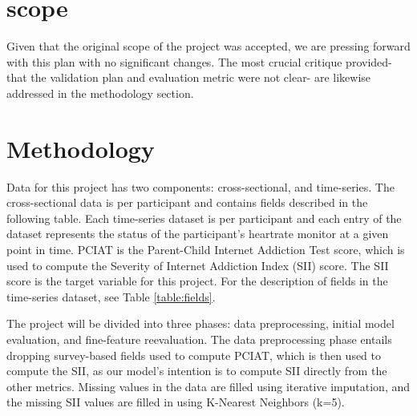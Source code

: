 \documentclass[11pt]{extarticle}
\newcommand{\todo}{\textcolor{red}{TODO:}~}
\begin{document}
\section{scope}

    Given that the original scope of the project was accepted, we are pressing forward with this plan with no significant changes.
    The most crucial critique provided- that the validation plan and evaluation metric were not clear- are likewise addressed in the methodology section.

\section{Methodology} 

Data for this project has two components: cross-sectional, and time-series. The cross-sectional data is per participant and contains fields described in the following table.
Each time-series dataset is per participant and each entry of the dataset represents the status of the participant's heartrate monitor at a given point in time. PCIAT is the Parent-Child Internet Addiction Test score, which is used to compute the Severity of Internet Addiction Index (SII) score. The SII score is the target variable for this project. For the description of fields in the time-series dataset, see Table \ref{table:fields}.

The project will be divided into three phases: data preprocessing, initial model evaluation, and fine-feature reevaluation.
The data preprocessing phase entails dropping survey-based fields used to compute PCIAT, which is then used to compute the SII, as our model's intention is to compute SII directly from the other metrics.
Missing values in the data are filled using iterative imputation, and the missing SII values are filled in using K-Nearest Neighbors (k=5).
\end{document}
